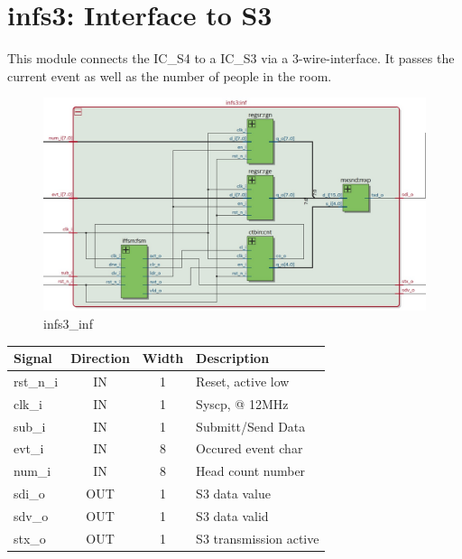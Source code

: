 \documentclass[12pt,a4 paper] {report}
\begin{document}
\section{infs3: Interface to S3}
This module connects the IC\_S4 to a IC\_S3 via a 3-wire-interface. It passes the current event as well as the number 
of people in the room.
\begin{figure}[h]
	\centering	
	\includegraphics[scale=0.3]{../png/infs3_inf.png}
	\caption{infs3\_inf}
\end{figure}
\begin{center}
	\begin{tabular}{ | p{2cm} | c | c | p{5cm} |}
		\hline
		\textbf{Signal} & \textbf{Direction} & \textbf{Width} & \textbf{Description} \\
		\hline	
  	rst\_n\_i & IN & 1 & Reset, active low \\
  	\hline
		clk\_i & IN & 1 & Syscp, @ 12MHz \\
		\hline
		sub\_i & IN & 1 & Submitt/Send Data \\
		\hline
		evt\_i & IN & 8 &  Occured event char \\
		\hline
		num\_i & IN & 8 & Head count number \\
		\hline
		sdi\_o & OUT & 1 & S3 data value \\
		\hline
		sdv\_o & OUT & 1 & S3 data valid \\
		\hline
		stx\_o & OUT & 1 & S3 transmission active\\
		\hline
	\end{tabular}
\end{center}

\newpage
\end{document}
